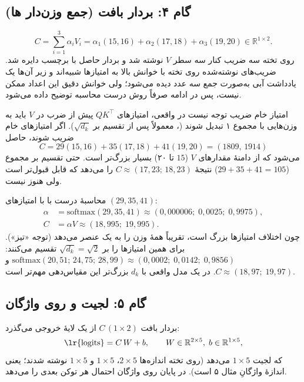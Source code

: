 \subsection{گام ۴: بردار بافت (جمع وزن‌دار ها)}
\[
C=\sum_{i=1}^{3}\alpha_i V_i=\alpha_1(15,16)+\alpha_2(17,18)+\alpha_3(19,20)\in\mathbb{R}^{1\times 2}.
\]
روی تخته سه ضریب کنار سه سطر $V$ نوشته شد و بردار حاصل با برچسب  دایره شد. ضریب‌های نوشته‌شده روی تخته با خوانش بالا به امتیازها شبیه‌اند و زیر آن‌ها یک یادداشت آبی به‌صورت جمع سه عدد دیده می‌شود؛ ولی خوانش دقیق این اعداد ممکن نیست، پس در ادامه صرفاً روش درست محاسبه توضیح داده می‌شود.

\begin{correctionbox}{امتیاز خام ضریب توجه نیست}
در  واقعی، امتیازهای $QK^\top$ پیش از ضرب در $V$ باید به وزن‌هایی با مجموع ۱ تبدیل شوند (، معمولاً پس از تقسیم بر $\sqrt{d_k}$). اگر امتیازهای خام ضریب شوند، حاصل
\[C=29(15,16)+35(17,18)+41(19,20)=(1809,\,1914)\]
می‌شود که از دامنهٔ مقدارهای $V$ ($15$ تا ۲۰) بسیار بزرگ‌تر است. حتی تقسیم بر مجموع ($29+35+41=105$) نتیجهٔ $C\approx(17{,}23;\,18{,}23)$ را می‌دهد که قابل قبول‌تر است ولی هنوز  نیست.
\end{correctionbox}

\begin{addedbox}{محاسبهٔ درست با }
با امتیازهای $(29,35,41)$:
\[
\begin{aligned}
\alpha&=\mathrm{softmax}(29,35,41)\approx(0{,}000006;\;0{,}0025;\;0{,}9975),\\
C&=\alpha V\approx(18{,}995;\;19{,}995).
\end{aligned}
\]
چون اختلاف امتیازها بزرگ است،  تقریباً همهٔ وزن را به یک عنصر می‌دهد (توجه «تیز»). برای همین امتیازها را بر $\sqrt{d_k}=\sqrt2$ تقسیم می‌کنند:
$\mathrm{softmax}(20{,}51;\,24{,}75;\,28{,}99)\approx(0{,}0002;\;0{,}0142;\;0{,}9856)$ و $C\approx(18{,}97;\;19{,}97)$. در یک مدل واقعی با $d_k$ بزرگ‌تر این مقیاس‌دهی مهم‌تر است.
\end{addedbox}

\subsection{گام ۵: لجیت و  روی واژگان}
بردار بافت $C\,(1\times2)$ از یک لایهٔ خروجی می‌گذرد:
\[
\text{\lr{logits}} = C\,W + b,\qquad W\in\mathbb{R}^{2\times 5},\; b\in\mathbb{R}^{1\times 5},
\]
که لجیت $1\times 5$ می‌دهد (روی تخته اندازه‌ها $2\times5$، $1\times5$ و $1\times5$ نوشته شدند؛ یعنی اندازهٔ واژگانِ مثال ۵ است). در پایان  روی واژگان احتمال هر توکن بعدی را می‌دهد.

